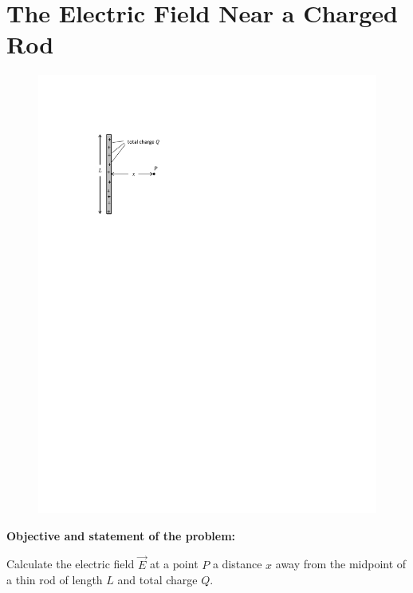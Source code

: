 \section{The Electric Field Near a Charged Rod}


\makelabheader %

\begin{figure}
\vspace{-.25in}
\hspace{0.13in}\includegraphics{electric_field_near_a_charged_rod/fig1.pdf}
\end{figure}

\vspace{1cm}

\textbf{Objective and statement of the problem:}

Calculate the electric field $\vec{E}$ at a point $P$ a distance $x$ away from the midpoint of a thin rod
of length $L$ and total charge $Q$.

